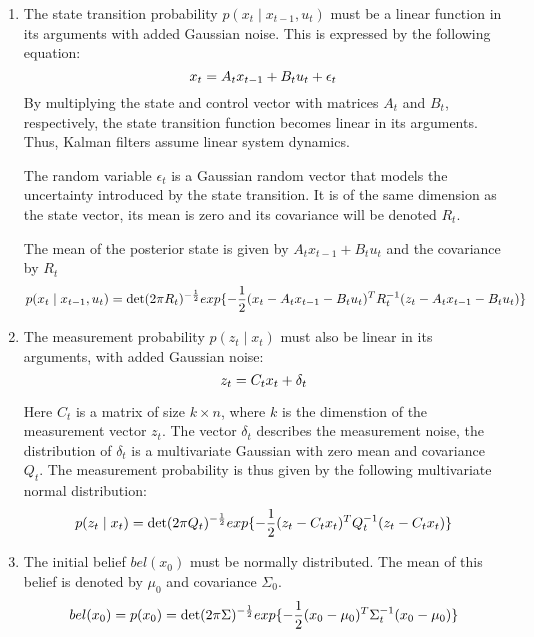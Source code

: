\documentclass[14pt,letterpaper]{article}
\theoremstyle{definition}
\begin{document}
\begin{enumerate}
  \item The state transition probability $p(x_t \mid x_{t-1}, u_t)$ must be a linear function in its arguments with added Gaussian noise. This is expressed by the following equation:
    \begin{equation}
      x_t = A_t x_{t-1} + B_t u_t + \epsilon_t \\
    \end{equation}
    By multiplying the state and control vector with matrices $A_t$ and $B_t$, respectively, the state transition function becomes linear in its arguments.
    Thus, Kalman filters assume linear system dynamics.

    The random variable $\epsilon_t$ is a Gaussian random vector that models the uncertainty introduced by the state transition.
    It is of the same dimension as the state vector, its mean is zero and its covariance will be denoted $R_t$.

    The mean of the posterior state is given by $A_t x_{t-1} + B_t u_t$ and the covariance by $R_t$
    \begin{equation}
      p(x_t \mid x_{t-1}, u_t) = \det(2\pi R_t)^{-\frac{1}{2}} exp{ \{-\frac{1}{2} (x_t - A_t x_{t-1} - B_t u_t)^T R_t^{-1} (z_t -A_t x_{t-1} - B_t u_t)\}} \\
    \end{equation}

  \item The measurement probability $p(z_t \mid x_t)$ must also be linear in its arguments, with added Gaussian noise:
    \begin{equation}
      z_t = C_t x_t + \delta_t \\
    \end{equation}

    Here $C_t$ is a matrix of size $k \times n$, where $k$ is the dimenstion of the measurement vector $z_t$.
    The vector $\delta_t$ describes the measurement noise, the distribution of $\delta_t$ is a multivariate Gaussian with zero mean and covariance $Q_t$.
    The measurement probability is thus given by the following multivariate normal distribution:
    \begin{equation}
      p(z_t \mid x_t) = \det(2\pi Q_t)^{-\frac{1}{2}} exp{ \{-\frac{1}{2} (z_t -C_t x_t)^T Q_t^{-1} (z_t - C_t x_t)\}} \\
    \end{equation}

  \item The initial belief $bel(x_0)$ must be normally distributed. The mean of this belief is denoted by $\mu_0$ and covariance $\Sigma_0$.
    \begin{equation}
      bel(x_0) = p(x_0) = \det(2\pi \Sigma) ^{-\frac{1}{2}} exp{ \{-\frac{1}{2} (x_0 - \mu_0)^T \Sigma_t^{-1} (x_0 - \mu_0)\}} \\
    \end{equation}

\end{enumerate}
\end{document}

